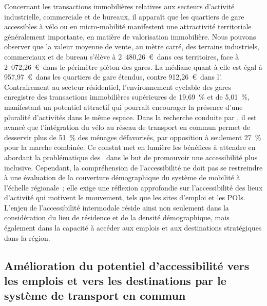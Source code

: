 \begin{refsegment}
Concernant les transactions immobilières relatives aux secteurs d'activité industrielle, commerciale et de bureaux, il apparaît que les quartiers de gare accessibles à vélo ou en micro-mobilité manifestent une attractivité territoriale généralement importante, en matière de valorisation immobilière. Nous pouvons observer que la valeur moyenne de vente, au mètre carré, des terrains industriels, commerciaux et de bureau s'élève à 2~480,26~\euro~dans ces territoires, face à 2~072,26~\euro~dans le périmètre piéton des gares. La médiane quant à elle est égal à 957,97~\euro~dans les quartiers de gare étendus, contre 912,26~\euro~dans l'. Contrairement au secteur résidentiel, l'environnement cyclable des gares enregistre des transactions immobilières supérieures de 19,69~\% et de 5,01~\%, manifestant un potentiel attractif qui pourrait encourager la présence d'une pluralité d'activités dans le même espace. Dans la recherche conduite par \textcolor{blue}{\textcite[10]{zuo_determining_2018}}, il est avancé que l'intégration du vélo au réseau de transport en commun permet de desservir plus de 51~\% des ménages défavorisés, par opposition à seulement 27~\% pour la marche combinée. Ce constat met en lumière les bénéfices à attendre en abordant la problématique des ~dans le but de promouvoir une accessibilité plus inclusive. Cependant, la compréhension de l'accessibilité ne doit pas se restreindre à une évaluation de la couverture démographique du système de mobilité à l'échelle régionale~; elle exige une réflexion approfondie sur l'accessibilité des lieux d'activité qui motivent le mouvement, tels que les sites d'emploi et les \acrshort{POIs}. L'enjeu de l'accessibilité intermodale réside ainsi non seulement dans la considération du lieu de résidence et de la densité démographique, mais également dans la capacité à accéder aux emplois et aux destinations stratégiques dans la région.%

\subsection{Amélioration du potentiel d'accessibilité vers les emplois et vers les destinations par le système de transport en commun
    \label{chap5:accessibilite-emplois}
    }


\end{refsegment}

